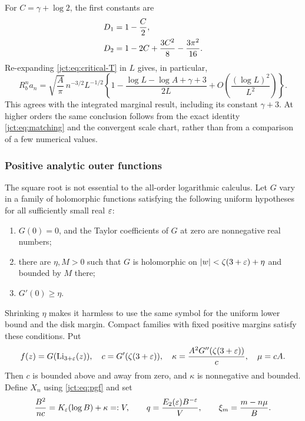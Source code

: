 For $C=\gamma+\log2$, the first constants are
\begin{align}
 D_1&=1-\frac C2,\notag\\
 D_2&=1-2C+\frac{3C^2}{8}-\frac{3\pi^2}{16}.
 \label{jct:eq:D-first}
\end{align}
Re-expanding \eqref{jct:eq:critical-T} in $L$ gives, in particular,
\begin{equation}\label{jct:eq:marginal-old-first}
 R_b^n a_n=\sqrt{\frac A\pi}\,n^{-3/2}L^{-1/2}
 \left\{1-\frac{\log L-\log A+\gamma+3}{2L}
              +O\left(\frac{(\log L)^2}{L^2}\right)\right\}.
\end{equation}
This agrees with the integrated marginal result, including its
constant $\gamma+3$. At higher orders the same conclusion follows
from the exact identity \eqref{jct:eq:matching} and the convergent scale
chart, rather than from a comparison of a few numerical values.

\subsubsection{Positive analytic outer functions}

The square root is not essential to the all-order logarithmic
calculus. Let $G$ vary in a family of holomorphic functions satisfying
the following uniform hypotheses for all sufficiently small real
$\varepsilon$:
\begin{enumerate}[label=(\roman*)]
\item $G(0)=0$, and the Taylor coefficients of $G$ at zero are
nonnegative real numbers;
\item there are $\eta,M>0$ such that $G$ is holomorphic on
$|w|<\zeta(3+\varepsilon)+\eta$ and bounded by $M$ there;
\item $G'(0)\ge\eta$.
\end{enumerate}
Shrinking $\eta$ makes it harmless to use the same symbol for the
uniform lower bound and the disk margin. Compact families with fixed
positive margins satisfy these conditions. Put
\begin{equation}\label{jct:eq:G-parameters}
 f(z)=G(\operatorname{Li}_{3+\varepsilon}(z)),\quad
 c=G'(\zeta(3+\varepsilon)),\quad
 \kappa=\frac{A^2G''(\zeta(3+\varepsilon))}{c},\quad \mu=cA.
\end{equation}
Then $c$ is bounded above and away from zero, and $\kappa$ is
nonnegative and bounded. Define $X_n$ using \eqref{jct:eq:pgf} and set
\begin{equation}\label{jct:eq:G-scale}
 \frac{B^2}{nc}=K_\varepsilon(\log B)+\kappa=:V,
 \qquad q=\frac{E_2(\varepsilon)B^{-\varepsilon}}{V},\qquad
 \xi_m=\frac{m-n\mu}{B}.
\end{equation}

